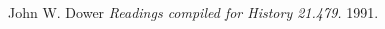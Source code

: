 \documentclass{l3proj}
\begin{document}
\begin{thebibliography}{1}
{} John W. Dower {\em Readings compiled for History
21.479.}  1991.

\end{thebibliography}

\clearpage
\printglossaries %
\end{document}
